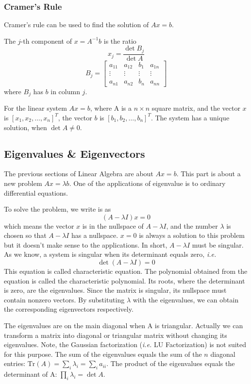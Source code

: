 \subsubsection{Cramer's Rule}

 Cramer's rule can be used to find the solution of $Ax=b$.

 The $j$-th component of $x=A^{-1}b$ is the ratio
 $$x_j = \frac{\det B_j}{\det A}$$
 $$B_j = \begin{bmatrix} a_{11} & a_{12} & b_1 & a_{1n} \\
	 \vdots & \vdots & \vdots & \vdots \\
	 a_{n1} & a_{n2} & b_n & a_{nn} \end{bmatrix}$$
 where $B_j$ has $b$ in column $j$.

 For the linear system $Ax = b$, where A is a $n\times n$
 square matrix, and the vector $x$ is $\left[x_{1}, x_{2}, \ldots, x_{n}\right]^T$,
 the vector $b$ is $\left[b_{1}, b_{2}, \ldots, b_{n}\right]^T$. The system
 has a unique solution, when $\det A \ne 0$.

\subsection{Eigenvalues \& Eigenvectors}

 The previous sections of Linear Algebra are about $Ax=b$. This part is
 about a new problem $Ax=\lambda b$. One of the applications of eigenvalue
 is to ordinary differential equations.

 To solve the problem, we write is as
 $$(A-\lambda I)x = 0$$
 which means the vector $x$ is in the nullspace of $A-\lambda I$, and the
 number $\lambda$ is chosen so that $A-\lambda I$ has a nullspace.
 $x=0$ is always a solution to this problem but it doesn't make sense to
 the applications. In short, $A-\lambda I$ must be singular. As we know,
 a system is singular when its determinant equals zero, {\it i.e.}
 $$\det (A-\lambda I) = 0$$
 This equation is called characteristic equation. The polynomial obtained
 from the equation is called the characteristic polynomial. Its roots,
 where the determinant is zero, are the eigenvalues. Since the matrix
 is singular, its nullspace must contain nonzero vectors. By substituting
 $\lambda$ with the eigenvalues, we can obtain the corresponding eigenvectors
 respectively.

 The eigenvalues are on the main diagonal when A is triangular. Actually
 we can transform a matrix into diagonal or triangular matrix without changing
 its eigenvalues. Note, the Gaussian factorization ({\it i.e.} LU Factorization)
 is not suited for this purpose. The sum of the eigenvalues equals the sum
 of the $n$ diagonal entries: $\text{Tr}(A) = \sum_i \lambda_i = \sum_i a_{ii}$.
 The product of the eigenvalues equals the determinant of A:
 $\prod_i \lambda_i = \det A$.

